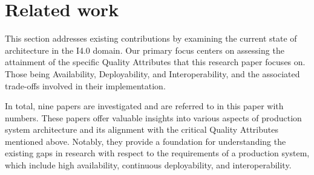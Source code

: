\section{Related work}
\label{sec:related_work}










This section addresses existing contributions by examining the current state of architecture in the I4.0 domain. Our primary focus centers on assessing the attainment of the specific Quality Attributes that this research paper focuses on. Those being Availability, Deployability, and Interoperability, and the associated trade-offs involved in their implementation.

In total, nine papers are investigated and are referred to in this paper with numbers. These papers offer valuable insights into various aspects of production system architecture and its alignment with the critical Quality Attributes mentioned above. Notably, they provide a foundation for understanding the existing gaps in research with respect to the requirements of a production system, which include high availability, continuous deployability, and interoperability.


